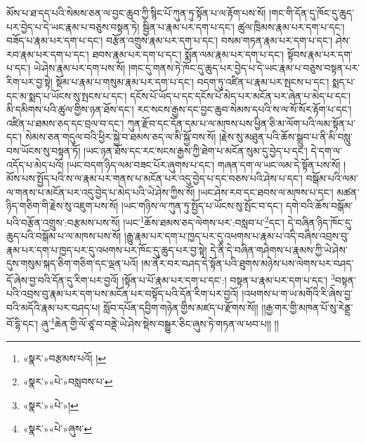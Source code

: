 མོས་པ་ཐ་དད་པའི་སེམས་ཅན་ལ་བྱང་ཆུབ་ཀྱི་སྙིང་པོ་ཀུན་ཏུ་སྟོན་པ་ལ་རྟོག་པས་སོ། །གང་གི་དོན་དུ་ཁོང་དུ་ཆུད་པར་བྱེད་པ་དེ་ཡང་རྣམ་པ་བཅུས་བསྟན་ཏེ། སྦྱིན་པ་རྣམ་པར་དག་པ་དང་། ཚུལ་ཁྲིམས་རྣམ་པར་དག་པ་དང་། བཟོད་པ་རྣམ་པར་དག་པ་དང་། བརྩོན་འགྲུས་རྣམ་པར་དག་པ་དང་། བསམ་གཏན་རྣམ་པར་དག་པ་དང་། ཤེས་རབ་རྣམ་པར་དག་པ་དང་། ཐབས་རྣམ་པར་དག་པ་དང་། སྨོན་ལམ་རྣམ་པར་དག་པ་དང་། སྟོབས་རྣམ་པར་དག་པ་དང་། ཡེ་ཤེས་རྣམ་པར་དག་པས་སོ། །གང་དུ་གནས་ཏེ་ཁོང་དུ་ཆུད་པར་བྱེད་པ་དེ་ཡང་རྣམ་པ་བཅུས་བསྟན་པར་རིག་པར་བྱ་སྟེ། སྡོམ་པ་རྣམ་པ་གསུམ་རྣམ་པར་དག་པ་དང་། བདག་ཏུ་འཛིན་པ་རྣམ་པར་སྤངས་པ་དང་། སྨད་པ་དང་མ་སྨད་པ་ཡོངས་སུ་སྤངས་པ་དང་། དངོས་པོ་ཡོད་པ་དང་དངོས་པོ་མེད་པར་མངོན་པར་ཞེན་པ་མེད་པ་དང་། མི་དམིགས་པའི་ཚུལ་གྱིས་ཉན་ཐོས་དང་། རང་སངས་རྒྱས་དང་བྱང་ཆུབ་སེམས་དཔའི་ས་ལ་སོ་སོར་རྟོག་པ་དང་། འཛིན་པ་ཐམས་ཅད་དང་བྲལ་བ་དང་། ཀུན་རྫོབ་དང་དོན་དམ་པ་ལ་མཁས་པས་ཕྱིན་ཅི་མ་ལོག་པའི་ལམ་སྟོན་པ་དང་། སེམས་ཅན་གདུལ་བའི་ཕྱིར་སྐྱེ་བ་ཐམས་ཅད་ལ་མི་སྐྱོ་བས་སོ། །རྗེས་སུ་མཐུན་པའི་ཆོས་སྒྲུབ་པ་ནི་མི་བསླུ་བས་ཡོངས་སུ་བསྟན་ཏོ། །ཡང་ཉན་ཐོས་དང་རང་སངས་རྒྱས་ཀྱི་ཐེག་པ་མངོན་སུམ་དུ་བྱེད་པ་དང་། དེ་དག་ལ་འདོད་པ་མེད་པའོ། །ཡང་བདག་ཉིད་ལམ་བཟང་པོར་ཞུགས་པ་དང་། གཞན་དག་ལ་ཡང་ལམ་དེ་སྟོན་པས་སོ། །མོས་པས་སྤྱོད་པའི་ས་ལ་རྣམ་པར་གནས་པ་མངོན་པར་འདུ་བྱེད་པ་དང་བཅས་པའི་ཤེས་པ་དང་། བསྒོམ་པའི་ལམ་ལ་གནས་པ་མངོན་པར་འདུ་བྱེད་པ་མེད་པའི་ཡེ་ཤེས་ཀྱིས་སོ། །ཡང་ཤེས་རབ་དང་ཐབས་ལ་མཁས་པ་དང་། མཚན་ཉིད་གཅིག་གི་རྗེས་སུ་འཇུག་པས་སོ། །ཡང་གཉིས་ལ་ཀུན་ཏུ་སྤྱོད་པ་ཡོངས་སུ་སྤོང་བ་དང་། དགེ་བའི་ཆོས་བསྒོམ་པའི་བརྩོན་འགྲུས་:བརྩམས་པས་སོ། །ཡང་\footnote{«སྣར་»བརྩམས་པའོ། །}ཆོས་ཐམས་ཅད་ལེགས་པར་:བསླབ་པ་\footnote{«སྣར་»«པེ་»བསླབས་པ་}དང་། དེ་བཞིན་ཉིད་ཁོང་དུ་ཆུད་པའི་བསྒོམ་པ་ལ་མཁས་པས་སོ། །རྒྱུ་རྣམ་པར་དག་པ་ཁྱད་པར་དུ་འཕགས་པ་རྣམ་པ་འདི་བཞིས་འབྲས་བུ་རྣམ་པར་དག་པ་ཁྱད་པར་དུ་འཕགས་པར་ཁོང་དུ་ཆུད་པར་བྱ་སྟེ། དེ་ནི་དེ་བཞིན་གཤེགས་པ་རྣམས་ཀྱི་ཡེ་ཤེས་དུས་གསུམ་སྐད་ཅིག་གཅིག་དང་ལྡན་པའོ། །མ་ནོར་བར་བཤད་དེ་སྟོན་པའི་ཐུགས་མཉེས་པས་ལེགས་པར་བཤད་དོ་ཞེས་བྱ་བའི་དོན་དུ་རིག་པར་བྱའོ། །སྟོན་པ་པོ་རྣམ་པར་དག་པ་དང་:། བསྟན་པ་རྣམ་པར་དག་པ་དང་། \footnote{«སྣར་»«པེ་»།  }བསྟན་པའི་འབྲས་བུ་རྣམ་པར་དག་པས་མངོན་པར་བསྟོད་པའི་དོན་རིག་པར་བྱའོ། །འཕགས་པ་ག་ཡ་མགོའི་རི་ཞེས་བྱ་བའི་མདོའི་རྣམ་པར་བཤད་པ། སློབ་དཔོན་དབྱིག་གཉེན་གྱིས་མཛད་པ་རྫོགས་སོ།། །།རྒྱ་གར་གྱི་མཁན་པོ་སུ་རེནྡྲ་བོ་དྷི་དང་། ཞུ་\footnote{«སྣར་»«པེ་»ཞུས་}ཆེན་གྱི་ལོ་ཙཱ་བ་བནྡེ་ཡེ་ཤེས་སྡེས་བསྒྱུར་ཅིང་ཞུས་ཏེ་གཏན་ལ་ཕབ་པ།། །།